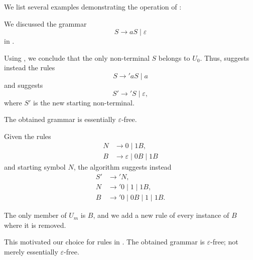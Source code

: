 \begin{example}\label{ex:alg:epsilon_rule_removal}
  We list several examples demonstrating the operation of :
  \begin{thmenum}
     We discussed the grammar
    \begin{equation*}
      S \to aS \mid \varepsilon
    \end{equation*}
    in .

    Using , we conclude that the only non-terminal \( S \) belongs to \( U_0 \). Thus,  suggests instead the rules
    \begin{equation*}
      S \to' aS \mid a
    \end{equation*}
    and  suggests
    \begin{equation*}
      S' \to' S \mid \varepsilon,
    \end{equation*}
    where \( S' \) is the new starting non-terminal.

    The obtained grammar is essentially \( \varepsilon \)-free.

     Given the rules
    \begin{equation*}
      \begin{aligned}
        N &\to 0 \mid 1 B, \\
        B &\to \varepsilon \mid 0 B \mid 1 B
      \end{aligned}
    \end{equation*}
    and starting symbol \( N \), the algorithm suggests instead
    \begin{equation*}
      \begin{aligned}
        S' &\to' N, \\
        N  &\to' 0 \mid 1 \mid 1 B, \\
        B  &\to' 0 \mid 0 B \mid 1 \mid 1 B.
      \end{aligned}
    \end{equation*}

    The only member of \( U_m \) is \( B \), and we add a new rule of every instance of \( B \) where it is removed.

    This motivated our choice for rules in . The obtained grammar is \( \varepsilon \)-free; not merely essentially \( \varepsilon \)-free.


\end{thmenum}
\end{example}
